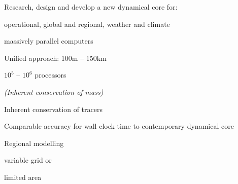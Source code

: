 \begin{slide}

\begin{list0}

\item Research, design and develop a new dynamical core for:
    \begin{list1}
    \item operational, global and regional, weather and climate
    \item massively parallel computers
    \end{list1}
\end{list0}


\begin{list0}
\item Unified approach: 100m -- 150km
\item $10^5$ -- $10^6$ processors
\item {\color{purple}\it (Inherent conservation of mass)}
\item Inherent conservation of tracers
\item Comparable accuracy for wall clock time to contemporary dynamical core
\item Regional modelling
    \begin{list1}
    \item variable grid or
    \item limited area
    \end{list1}
\end{list0}

\end{slide}
